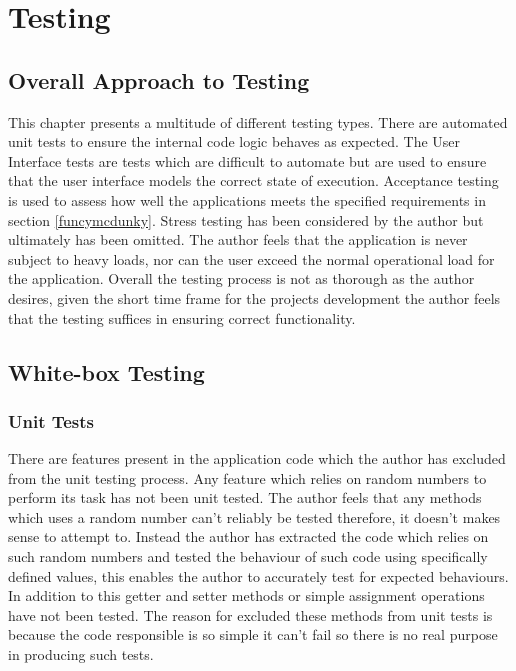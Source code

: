 \chapter{Testing}

\section{Overall Approach to Testing}

This chapter presents a multitude of different testing types. There are automated unit tests to ensure the internal code logic behaves as expected. The User Interface tests are tests which are difficult to automate but are used to ensure that the user interface models the correct state of execution. Acceptance testing is used to assess how well the applications meets the specified requirements in section \ref{funcymcdunky}. Stress testing has been considered by the author but ultimately has been omitted. The author feels that the application is never subject to heavy loads, nor can the user exceed the normal operational load for the application. Overall the testing process is not as thorough as the author desires, given the short time frame for the projects development the author feels that the testing suffices in ensuring correct functionality.

\section{White-box Testing}
\subsection{Unit Tests}

There are features present in the application code which the author has excluded from the unit testing process. Any feature which relies on random numbers to perform its task has not been unit tested. The author feels that any methods which uses a random number can’t reliably be tested therefore, it doesn’t makes sense to attempt to. Instead the author has extracted the code which relies on such random numbers and tested the behaviour of such code using specifically defined values, this enables the author to accurately test for expected behaviours. In addition to this getter and setter methods or simple assignment operations have not been tested. The reason for excluded these methods from unit tests is because the code responsible is so simple it can’t fail so there is no real purpose in producing such tests.

